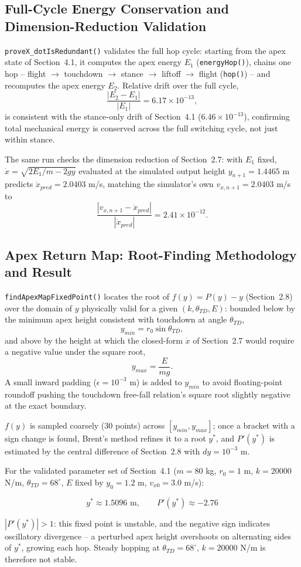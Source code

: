 \documentclass[11pt]{article}
\begin{document}
\subsection{Full-Cycle Energy Conservation and Dimension-Reduction Validation}
\texttt{proveX\_dotIsRedundant()} validates the full hop cycle: starting
from the apex state of Section~4.1, it computes the apex energy $E_1$
(\texttt{energyHop()}), chains one hop -- flight $\to$ touchdown $\to$
stance $\to$ liftoff $\to$ flight (\texttt{hop()}) -- and recomputes
the apex energy $E_2$. Relative drift over the full cycle,
\[
    \frac{|E_2-E_1|}{|E_1|} = 6.17\times10^{-13},
\]
is consistent with the stance-only drift of Section~4.1
($6.46\times10^{-13}$), confirming total mechanical energy is
conserved across the full switching cycle, not just within stance.

The same run checks the dimension reduction of Section~2.7: with
$E_1$ fixed, $\dot x=\sqrt{2E_1/m-2gy}$ evaluated at the simulated
output height $y_{n+1}=1.4465$ m predicts $\dot x_{pred}=2.0403$ m/s,
matching the simulator's own $v_{x,n+1}=2.0403$ m/s to
\[
    \frac{|v_{x,n+1}-\dot x_{pred}|}{|\dot x_{pred}|} = 2.41\times10^{-12}.
\]

\subsection{Apex Return Map: Root-Finding Methodology and Result}
\label{sec:apexmapresult}
\texttt{findApexMapFixedPoint()} locates the root of $f(y)=P(y)-y$
(Section~2.8) over the domain of $y$ physically valid for a given
$(k,\theta_{TD},E)$: bounded below by the minimum apex height
consistent with touchdown at angle $\theta_{TD}$,
\[
    y_{min} = r_0\sin\theta_{TD},
\]
and above by the height at which the closed-form $\dot x$ of
Section~2.7 would require a negative value under the square root,
\[
    y_{max}=\frac{E}{mg}.
\]
A small inward padding ($\epsilon=10^{-3}$ m) is added to $y_{min}$
to avoid floating-point roundoff pushing the touchdown free-fall
relation's square root slightly negative at the exact boundary.

$f(y)$ is sampled coarsely (30 points) across $[y_{min},y_{max}]$;
once a bracket with a sign change is found, Brent's method refines it
to a root $y^\ast$, and $P'(y^\ast)$ is estimated by the central
difference of Section~2.8 with $dy=10^{-3}$ m.

For the validated parameter set of Section~4.1 ($m=80$ kg, $r_0=1$ m,
$k=20000$ N/m, $\theta_{TD}=68^\circ$, $E$ fixed by $y_0=1.2$ m,
$v_{x0}=3.0$ m/s):
\begin{result}
\[
    y^\ast \approx 1.5096\text{ m}, \qquad P'(y^\ast) \approx -2.76
\]
\end{result}
$|P'(y^\ast)|>1$: this fixed point is unstable, and the negative sign
indicates oscillatory divergence -- a perturbed apex height overshoots
on alternating sides of $y^\ast$, growing each hop. Steady hopping at
$\theta_{TD}=68^\circ$, $k=20000$ N/m is therefore not stable.
\end{document}
